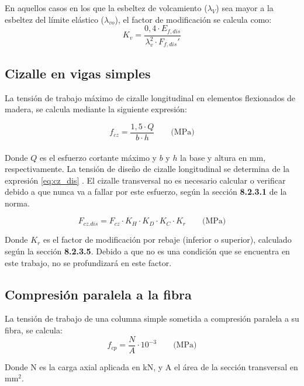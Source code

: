 En aquellos casos en los que la esbeltez de volcamiento ($\lambda_V$) sea mayor a la esbeltez del límite elástico ($\lambda_{vo}$), el factor de modificación se calcula como:
\begin{equation}\label{eq:k_v}
	K_v = \frac{0,4\cdot E_{f,dis}}{\lambda_{v}^2 \cdot F_{f,dis}'}
\end{equation}

\subsection{Cizalle en vigas simples}
La tensión de trabajo máximo de cizalle longitudinal en elementos flexionados de madera, se calcula mediante la siguiente expresión:

\begin{equation} \label{eq:f_cz}
f_{cz} = \frac{1,5 \cdot Q}{b \cdot h} \qquad \text{(MPa)}
\end{equation}
\\
Donde $Q$ es el esfuerzo cortante máximo y $b$ y $h$ la base y altura en mm, respectivamente. La tensión de diseño de cizalle longitudinal se determina de la expresión \ref{eq:cz_dis} . El cizalle transversal no es necesario calcular o verificar debido a que nunca va a fallar por este esfuerzo, según la sección \textbf{8.2.3.1} de la norma.

\begin{equation}\label{eq:cz_dis}
	F_{cz.dis} = F_{cz} \cdot K_H \cdot K_D \cdot K_C \cdot K_r \qquad \text{(MPa)}
\end{equation}

Donde $K_r$ es el factor de modificación por rebaje (inferior o superior), calculado según la sección \textbf{8.2.3.5}. Debido a que no es una condición que se encuentra en este trabajo, no se profundizará en este factor.\\


\subsection{Compresión paralela a la fibra}
\label{sec:cp}
La tensión de trabajo de una columna simple sometida a compresión paralela a su fibra, se calcula:
\begin{equation}\label{eq:f_cp}
	f_{cp}= \frac{N}{A} \cdot 10^{-3} \qquad \text{(MPa)}
\end{equation}

Donde N es la carga axial aplicada en kN, y A el área de la sección transversal en mm$^2$. \\

